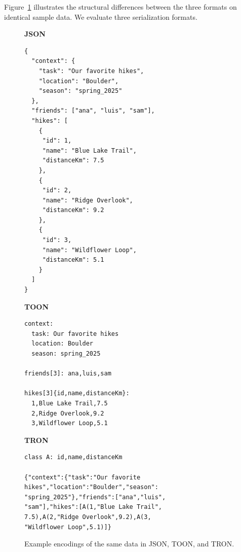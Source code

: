 \documentclass[11pt]{article}
\begin{document}
Figure~\ref{fig:serialization_examples} illustrates the structural differences between the three formats on identical sample data. We evaluate three serialization formats.

\begin{figure}[t]
\centering
\scriptsize

\begin{minipage}[t]{0.32\textwidth}
\textbf{JSON}
\vspace{2mm}

\begin{verbatim}
{
  "context": {
    "task": "Our favorite hikes",
    "location": "Boulder",
    "season": "spring_2025"
  },
  "friends": ["ana", "luis", "sam"],
  "hikes": [
    {
     "id": 1, 
     "name": "Blue Lake Trail",
     "distanceKm": 7.5
    },
    {
     "id": 2, 
     "name": "Ridge Overlook",
     "distanceKm": 9.2
    },
    {
     "id": 3, 
     "name": "Wildflower Loop",
     "distanceKm": 5.1
    }
  ]
}
\end{verbatim}
\end{minipage}
\hfill
\begin{minipage}[t]{0.32\textwidth}
\textbf{TOON}
\vspace{2mm}

\begin{verbatim}
context:
  task: Our favorite hikes
  location: Boulder
  season: spring_2025

friends[3]: ana,luis,sam

hikes[3]{id,name,distanceKm}:
  1,Blue Lake Trail,7.5
  2,Ridge Overlook,9.2
  3,Wildflower Loop,5.1
\end{verbatim}
\end{minipage}
\hfill
\begin{minipage}[t]{0.32\textwidth}
\textbf{TRON}
\vspace{2mm}

\begin{verbatim}
class A: id,name,distanceKm

{"context":{"task":"Our favorite
hikes","location":"Boulder","season":
"spring_2025"},"friends":["ana","luis",
"sam"],"hikes":[A(1,"Blue Lake Trail",
7.5),A(2,"Ridge Overlook",9.2),A(3,
"Wildflower Loop",5.1)]}
\end{verbatim}
\end{minipage}

\caption{Example encodings of the same data in JSON, TOON, and TRON.}
\label{fig:serialization_examples}

\end{figure}
\end{document}
